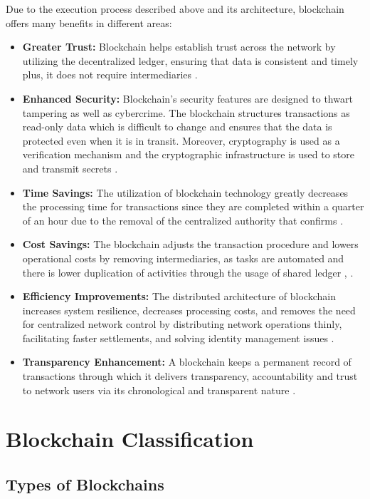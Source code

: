 Due to the execution process described above and its architecture, blockchain offers many benefits in different areas:

\begin{itemize}
  \item \textbf{Greater Trust:} Blockchain helps establish trust across the network by utilizing the decentralized ledger, ensuring that data is consistent and 
  timely plus, it does not require intermediaries \cite{9596538}. 
  \item \textbf{Enhanced Security:} Blockchain's security features are designed to thwart tampering as well as cybercrime. The blockchain structures transactions as 
  read-only data which is difficult to change and ensures that the data is protected even when it is in transit. Moreover, cryptography is used as a verification mechanism 
  and the cryptographic infrastructure is used to store and transmit secrets \cite{ibm_blockchain}.
  \item \textbf{Time Savings:} The utilization of blockchain technology greatly decreases the processing time for transactions since they are completed within a quarter of 
  an hour due to the removal of the centralized authority that confirms \cite{ibm_blockchain}.
  \item \textbf{Cost Savings:} The blockchain adjusts the transaction procedure and lowers operational costs by removing intermediaries, as tasks are automated and there 
  is lower duplication of activities through the usage of shared ledger \cite{9596538}, \cite{9036241}.
  \item \textbf{Efficiency Improvements:} The distributed architecture of blockchain increases system resilience, decreases processing costs, and removes the need for 
  centralized network control by distributing network operations thinly, facilitating faster settlements, and solving identity management issues \cite{9036241}.
  \item \textbf{Transparency Enhancement:} A blockchain keeps a permanent record of transactions through which it delivers transparency, accountability and trust to 
  network users via its chronological and transparent nature \cite{9036241}.
\end{itemize}

\section{Blockchain Classification}

\subsection{Types of Blockchains}

